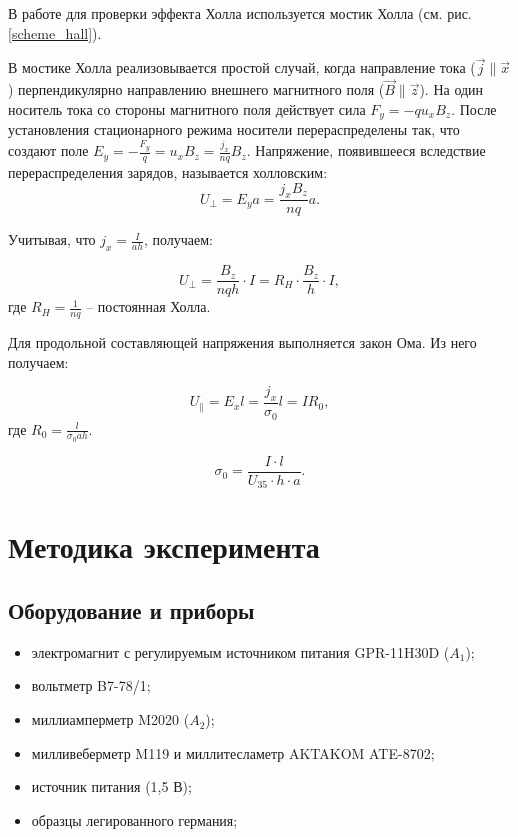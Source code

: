 \documentclass[12pt,a4paper]{article}
\newcommand{\figref}[1]{(см. рис. \ref{#1})}
\begin{document}
	В работе для проверки эффекта Холла используется мостик Холла \figref{scheme_hall}.
	
	В мостике Холла реализовывается простой случай, когда направление тока ($\vec{j} \parallel \vec{x}$) перпендикулярно направлению внешнего магнитного поля ($\vec{B} \parallel \vec{z}$). На один носитель тока со стороны магнитного поля действует сила $F_y = - q u_x B_z$. После установления стационарного режима носители перераспределены так, что создают поле $E_y = - \frac{F_y}{q} = u_x B_z = \frac{j_x}{nq} B_z$. Напряжение, появившееся вследствие перераспределения зарядов, называется холловским:
	$$ U_\perp = E_y a = \frac{j_x B_z}{n q} a. $$
	
	Учитывая, что $j_x = \frac{I}{ah}$, получаем:
	
	\begin{equation}
		\label{U_perp}
		U_\perp = \frac{B_z}{nqh} \cdot I = R_H \cdot \frac{B_z}{h} \cdot I,
	\end{equation}
	где $R_H = \frac{1}{nq}$ -- постоянная Холла.
	
	Для продольной составляющей напряжения выполняется закон Ома. Из него получаем:
	
	$$ U_\parallel = E_x l = \frac{j_x}{\sigma_0} l = I R_0, $$
	где $R_0 = \frac{l}{\sigma_0 a h}$.
	
	\begin{equation}
		\label{sigma_0}
		\sigma_0 = \frac{I \cdot l}{U_{35} \cdot h \cdot a}.
	\end{equation}
	
	
	\section*{Методика эксперимента}
	
	\subsection*{Оборудование и приборы}
	\begin{itemize}[itemsep = 0pt, parsep=0pt]
		\item электромагнит с регулируемым источником пи­тания GPR-11H30D ($A_1$);
		\item вольтметр B7-78/1;
		\item миллиамперметр M2020 ($A_2$);
		\item милливеберметр M119 и мил­литесламетр AKTAKOM ATE-8702;
		\item источник питания (1,5 В);
		\item образцы легированного германия;
	\end{itemize}
	
\end{document}

